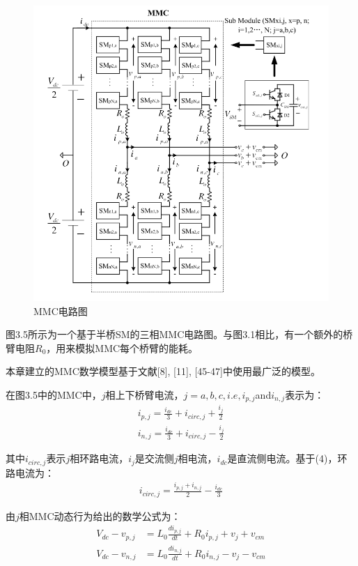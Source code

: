 \begin{figure}[H]
\centering
\includegraphics[width=1.05\textwidth]{images/Paper_Fig_6.png}
\setcaptionwidth{\linewidth}
\caption{MMC电路图}
\end{figure}
  图3.5所示为一个基于半桥SM的三相MMC电路图。与图3.1相比，有一个额外的桥臂电阻$R_0$，用来模拟MMC每个桥臂的能耗。
  
  本章建立的MMC数学模型基于文献[8], [11], [45-47]中使用最广泛的模型。
  
  在图3.5中的MMC中，$j$相上下桥臂电流，$j=a, b, c, i.e, i_{p, j}$and$i_{n, j}$表示为：
\begin{align*}
i_{p, j} = \frac{i_{dc}}{3}+i_{circ, j}+\frac{i_j}{2}\tag{4a}\\
i_{n, j} = \frac{i_{dc}}{3}+i_{circ, j}-\frac{i_j}{2}\tag{4b}
\end{align*}

  其中$i_{circ, j}$表示$j$相环路电流，$i_j$是交流侧$j$相电流，$i_{dc}$是直流侧电流。基于(4)，环路电流为：
\begin{align*}
i_{circ, j} = \frac{i_{p, j}+i_{n, j}}{2}-\frac{i_{dc}}{3}\tag{5}
\end{align*}

  由$j$相MMC动态行为给出的数学公式为：
\begin{align*}
V_{dc}-v_{p, j} &= L_0\frac{di_{p, j}}{dt}+R_0i_{p, j}+v_j+v_{cm}\tag{6a}\\
V_{dc}-v_{n, j} &= L_0\frac{di_{n, j}}{dt}+R_0i_{n, j}-v_j-v_{cm}\tag{6b}
\end{align*}

